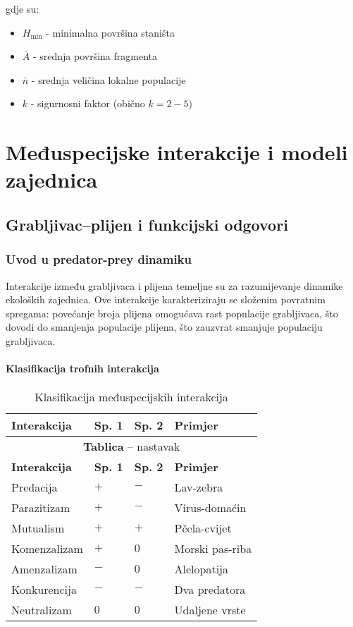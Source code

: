\documentclass[11pt,oneside]{book}
\begin{document}
gdje su:
\begin{itemize}
	\item $H_{\min}$ - minimalna površina staništa
	\item $\bar{A}$ - srednja površina fragmenta
	\item $\bar{n}$ - srednja veličina lokalne populacije
	\item $k$ - sigurnosni faktor (obično $k = 2-5$)
\end{itemize}
	
\chapter{Međuspecijske interakcije i modeli zajednica}

\section{Grabljivac--plijen i funkcijski odgovori}

\subsection{Uvod u predator-prey dinamiku}

Interakcije između grabljivaca i plijena temeljne su za razumijevanje dinamike ekoloških zajednica. Ove interakcije karakteriziraju se složenim povratnim spregama: povećanje broja plijena omogućava rast populacije grabljivaca, što dovodi do smanjenja populacije plijena, što zauzvrat smanjuje populaciju grabljivaca.

\subsubsection{Klasifikacija trofnih interakcija}

\begin{longtable}{|p{2.8cm}|p{1.5cm}|p{1.5cm}|p{5.5cm}|}
	\caption{Klasifikacija međuspecijskih interakcija} \\
	\hline
	\textbf{Interakcija} & \textbf{Sp. 1} & \textbf{Sp. 2} & \textbf{Primjer} \\
	\hline
	\endfirsthead
	\multicolumn{4}{c}{\textbf{Tablica} -- nastavak} \\
	\hline
	\textbf{Interakcija} & \textbf{Sp. 1} & \textbf{Sp. 2} & \textbf{Primjer} \\
	\hline
	\endhead
	\hline
	\endfoot
	\hline
	\endlastfoot
	
	Predacija & $+$ & $-$ & Lav-zebra \\
	\hline
	Parazitizam & $+$ & $-$ & Virus-domaćin \\
	\hline
	Mutualism & $+$ & $+$ & Pčela-cvijet \\
	\hline
	Komenzalizam & $+$ & $0$ & Morski pas-riba \\
	\hline
	Amenzalizam & $-$ & $0$ & Alelopatija \\
	\hline
	Konkurencija & $-$ & $-$ & Dva predatora \\
	\hline
	Neutralizam & $0$ & $0$ & Udaljene vrste \\
	\hline
\end{longtable}
\end{document}
